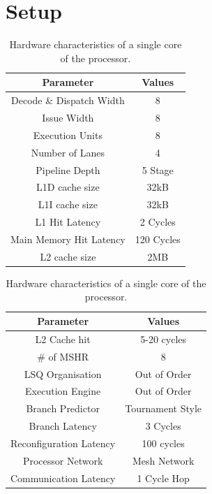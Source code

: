 \chapter{Setup}\label{chp:setup}
\vspace{-1em}
\begin{table}[ht]
\begin{minipage}{0.5\textwidth}
\begin{singlespace}
\begin{tabular} { cc }
      \toprule
      \textbf{Parameter} & \textbf{Values} \\ \midrule
	  Decode \& Dispatch Width & 8  \\
	  Issue Width & 8  \\
	  Execution Units & 8 \\
	  Number of Lanes & 4 \\
	  Pipeline Depth & 5 Stage \\
      L1D cache size & 32kB \\
      L1I cache size & 32kB \\
	  L1 Hit Latency & 2 Cycles \\
	  Main Memory Hit Latency & 120 Cycles\\
	  L2 cache size & 2MB \\
	  \end{tabular}
	  \end{singlespace}
\end{minipage}\hfill
\begin{minipage}{0.5\textwidth}
\begin{singlespace}
\begin{tabular} {cc }
      \toprule
      \textbf{Parameter} & \textbf{Values} \\ \midrule
	L2 Cache hit & 5-20 cycles \\
	  \# of MSHR & 8 \\
	  LSQ Organisation & Out of Order \\
	  Execution Engine & Out of Order \\
	  Branch Predictor & Tournament Style\\
	  Branch Latency & 3 Cycles \\
	  Reconfiguration Latency & 100 cycles\\
	  Processor Network & Mesh Network \\
	  Communication Latency & 1 Cycle Hop\\
	  
	  \end{tabular}
	  \end{singlespace}
\end{minipage}
\caption{Hardware characteristics of a single core of the processor.}\label{tab:processor}
\vspace{-3em}
\end{table}

